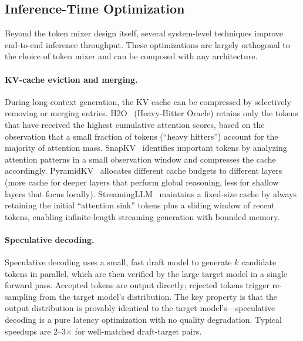\subsection{Inference-Time Optimization}
\label{subsec:inference-opt}

Beyond the token mixer design itself, several system-level techniques improve end-to-end inference throughput. These optimizations are largely orthogonal to the choice of token mixer and can be composed with any architecture.

\paragraph{KV-cache eviction and merging.}
During long-context generation, the KV cache can be compressed by selectively removing or merging entries. H2O~\cite{zhang2023h2o} (Heavy-Hitter Oracle) retains only the tokens that have received the highest cumulative attention scores, based on the observation that a small fraction of tokens (``heavy hitters'') account for the majority of attention mass. SnapKV~\cite{li2024snapkv} identifies important tokens by analyzing attention patterns in a small observation window and compresses the cache accordingly. PyramidKV~\cite{cai2024pyramidkv} allocates different cache budgets to different layers (more cache for deeper layers that perform global reasoning, less for shallow layers that focus locally). StreamingLLM~\cite{xiao2023streamingllm} maintains a fixed-size cache by always retaining the initial ``attention sink'' tokens plus a sliding window of recent tokens, enabling infinite-length streaming generation with bounded memory.

\paragraph{Speculative decoding.}
Speculative decoding uses a small, fast draft model to generate $k$ candidate tokens in parallel, which are then verified by the large target model in a single forward pass. Accepted tokens are output directly; rejected tokens trigger re-sampling from the target model's distribution. The key property is that the output distribution is provably identical to the target model's---speculative decoding is a pure latency optimization with no quality degradation. Typical speedups are 2--3$\times$ for well-matched draft-target pairs.

